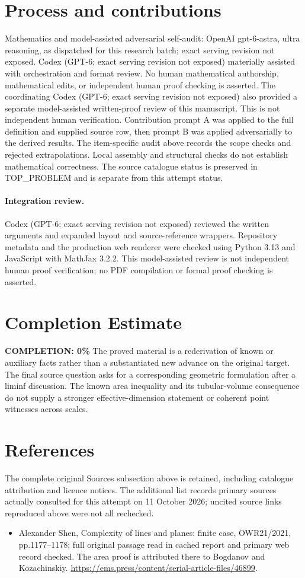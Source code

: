 \documentclass[11pt]{article}
\begin{document}
\section{Process and contributions}
Mathematics and model-assisted adversarial self-audit: OpenAI gpt-6-astra, ultra reasoning, as dispatched for this research batch; exact serving revision not exposed. Codex (GPT-6; exact serving revision not exposed) materially assisted with orchestration and format review. No human mathematical authorship, mathematical edits, or independent human proof checking is asserted.
The coordinating Codex (GPT-6; exact serving revision not exposed) also provided a separate model-assisted written-proof review of this manuscript. This is not independent human verification.
Contribution prompt A was applied to the full definition and supplied source row, then prompt B was applied adversarially to the derived results. The item-specific audit above records the scope checks and rejected extrapolations. Local assembly and structural checks do not establish mathematical correctness. The source catalogue status is preserved in TOP\_PROBLEM and is separate from this attempt status.
\paragraph{Integration review.} Codex (GPT-6; exact serving revision not exposed) reviewed the written arguments and expanded layout and source-reference wrappers. Repository metadata and the production web renderer were checked using Python 3.13 and JavaScript with MathJax 3.2.2. This model-assisted review is not independent human proof verification; no PDF compilation or formal proof checking is asserted.

\section{Completion Estimate}
\noindent\textbf{COMPLETION: 0\%}
The proved material is a rederivation of known or auxiliary facts rather than a substantiated new advance on the original target. The final source question asks for a corresponding geometric formulation after a liminf discussion. The known area inequality and its tubular-volume consequence do not supply a stronger effective-dimension statement or coherent point witnesses across scales.
\section{References}
The complete original Sources subsection above is retained, including catalogue attribution and licence notices. The additional list records primary sources actually consulted for this attempt on 11 October 2026; uncited source links reproduced above were not all rechecked.
\begin{itemize}
\item Alexander Shen, Complexity of lines and planes: finite case, OWR21/2021, pp.1177–1178; full original passage read in cached report and primary web record checked. The area proof is attributed there to Bogdanov and Kozachinskiy. \url{https://ems.press/content/serial-article-files/46899}.
\end{itemize}
\end{document}
